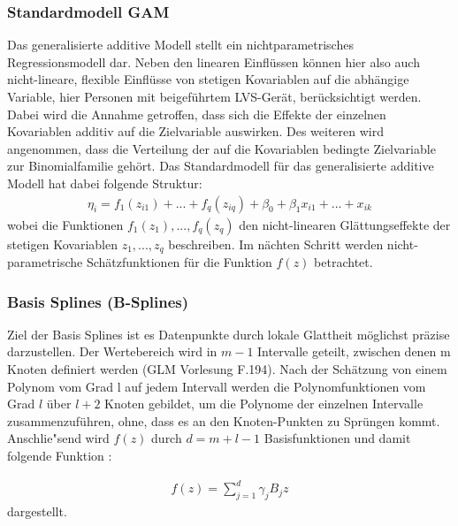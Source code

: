 \documentclass[12pt]{article}
\begin{document}
	\subsubsection{Standardmodell GAM}
	Das generalisierte additive Modell stellt ein nichtparametrisches Regressionsmodell dar.
	Neben den linearen Einﬂüssen können hier also auch nicht-lineare, flexible Einflüsse von stetigen Kovariablen auf die abhängige Variable, hier Personen mit beigeführtem LVS-Gerät, berücksichtigt werden. Dabei wird die Annahme getroffen, dass sich die Effekte der einzelnen Kovariablen additiv auf die Zielvariable auswirken. Des weiteren wird angenommen, dass die Verteilung der auf die Kovariablen bedingte Zielvariable zur Binomialfamilie gehört.
	Das Standardmodell für das generalisierte additive Modell hat dabei 
	folgende Struktur: \\
	\begin{align} 
	\eta_{i}=f_{1}(z_{i1})+...+f_{q}(z_{iq})+\beta_{0}+\beta_{1}x_{i1}+...+x_{ik}
	\end{align}
	wobei die Funktionen $f_{1}(z_{1}),...,f_{q}(z_{q})$ den nicht-linearen Glättungseffekte der stetigen  Kovariablen $z_{1},...,z_{q}$ beschreiben. Im nächten Schritt werden nicht-parametrische Schätzfunktionen für die Funktion $f(z)$ betrachtet.
	
	\subsubsection{Basis Splines (B-Splines)}
	Ziel der Basis Splines ist es Datenpunkte durch lokale Glattheit möglichst präzise darzustellen. Der Wertebereich wird in $m-1$ Intervalle geteilt, zwischen denen m Knoten definiert werden (GLM Vorlesung F.194). Nach der Schätzung von einem Polynom vom Grad l auf jedem Intervall werden die Polynomfunktionen vom Grad $l$ über $l + 2$ Knoten gebildet, um die Polynome der einzelnen Intervalle zusammenzuführen, ohne, dass es an den Knoten-Punkten zu Sprüngen kommt. Anschlie"send wird $f(z)$ durch $d = m+l-1$ Basisfunktionen und damit folgende Funktion :
	
	\begin{align}
	f(z)=\sum_{j=1}^d\gamma_{j}B_{j}z
	\end{align}
	dargestellt.
	
\end{document}
